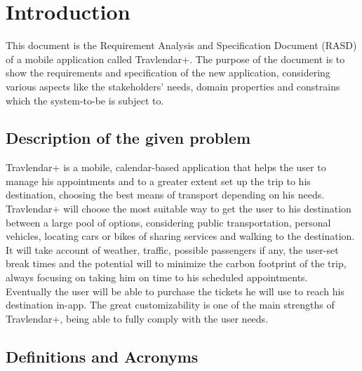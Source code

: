 %
%
\chapter{Introduction}
%
\label{cap:introduction}
%
%
This document is the Requirement Analysis and Specification Document (RASD) of a mobile application called Travlendar+. The purpose of the document is to show the requirements and specification of the new application, considering various aspects like the stakeholders' needs, domain properties and constrains which the system-to-be is subject to.
%
%
\section{Description of the given problem}
Travlendar+ is a mobile, calendar-based application that helps the user to manage his appointments and to a greater extent set up the trip to his destination, choosing the best means of transport depending on his needs. \\
Travlendar+ will choose the most suitable way to get the user to his destination between a large pool of options, considering public transportation, personal vehicles, locating cars or bikes of sharing services and walking to the destination. It will take account of weather, traffic, possible passengers if any, the user-set break times and the potential will to minimize the carbon footprint of the trip, always focusing on taking him on time to his scheduled appointments. \\
Eventually the user will be able to purchase the tickets he will use to reach his destination in-app. The great customizability is one of the main strengths of Travlendar+, being able to fully comply with the user needs. 
%
%
\section{Definitions and Acronyms}
%
